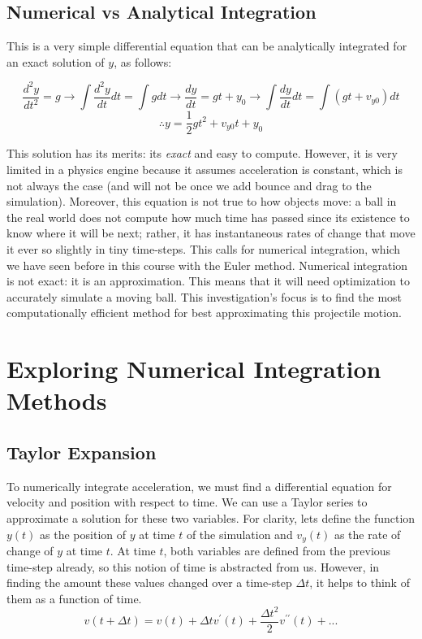 \documentclass[12pt]{article}
\begin{document}
\subsection{Numerical vs Analytical Integration}
This is a very simple differential equation that can be analytically integrated for an exact solution of $y$, as follows:

$$\frac{d^2y}{dt^2} = g \rightarrow \int \frac{d^2y}{dt} dt = \int g dt \rightarrow \frac{dy}{dt} = gt + y_0 \rightarrow \int \frac{dy}{dt} dt = \int (gt + v_{y0}) dt$$
$$\therefore y = \frac{1}{2} gt^2 + v_{y0} t + y_0 $$

This solution has its merits: its \textit{exact} and easy to compute. However, it is very limited in a physics engine because it assumes acceleration is constant, which is not always the case (and will not be once we add bounce and drag to the simulation). Moreover, this equation is not true to how objects move: a ball in the real world does not compute how much time has passed since its existence to know where it will be next; rather, it has instantaneous rates of change that move it ever so slightly in tiny time-steps. This calls for numerical integration, which we have seen before in this course with the Euler method. Numerical integration is not exact: it is an approximation. This means that it will need optimization to accurately simulate a moving ball. This investigation's focus is to find the most computationally efficient method for best approximating this projectile motion. 

\section{Exploring Numerical Integration Methods}

\subsection{Taylor Expansion}
To numerically integrate acceleration, we must find a differential equation for velocity and position with respect to time. We can use a Taylor series to approximate a solution for these two variables. For clarity, lets define the function $y(t)$ as the position of $y$ at time $t$ of the simulation and $v_y(t)$ as the rate of change of $y$ at time $t$. At time $t$, both variables are defined from the previous time-step already, so this notion of time is abstracted from us. However, in finding the amount these values changed over a time-step $\Delta t$, it helps to think of them as a function of time. 
$$v(t+\Delta t) = v(t) + \Delta t v^\prime(t) + \frac{\Delta t^2}{2}v^{\prime \prime}(t) + ...$$
\end{document}
